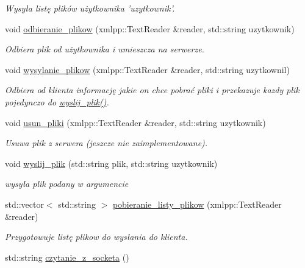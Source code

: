 \begin{CompactItemize}
\begin{CompactList}\small\item\em Wysyła listę plików użytkownika 'uzytkownik'. \item\end{CompactList}\item 
void \hyperlink{a00005_4e084ae10e8498b171c44a0138597d2e}{odbieranie\_\-plikow} (xmlpp::TextReader \&reader, std::string uzytkownik)
\begin{CompactList}\small\item\em Odbiera plik od użytkownika i umieszcza na serwerze. \item\end{CompactList}\item 
void \hyperlink{a00005_cc293df6220f5030fab5a7ee9cf8b1fa}{wysylanie\_\-plikow} (xmlpp::TextReader \&reader, std::string uzytkownil)
\begin{CompactList}\small\item\em Odbiera od klienta informację jakie on chce pobrać pliki i przekazuje kazdy plik pojedynczo do \hyperlink{a00005_771537f72f9e6a9cdb1d2961828eb66b}{wyslij\_\-plik()}. \item\end{CompactList}\item 
void \hyperlink{a00005_7ef79f818429f70b9cb35c0a33b59a10}{usun\_\-pliki} (xmlpp::TextReader \&reader, std::string uzytkownik)
\begin{CompactList}\small\item\em Usuwa plik z serwera (jeszcze nie zaimplementowane). \item\end{CompactList}\item 
void \hyperlink{a00005_771537f72f9e6a9cdb1d2961828eb66b}{wyslij\_\-plik} (std::string plik, std::string uzytkownik)
\begin{CompactList}\small\item\em wysyła plik podany w argumencie \item\end{CompactList}\item 
std::vector$<$ std::string $>$ \hyperlink{a00005_05500b74ebdcc1578ead4c31fca73a5b}{pobieranie\_\-listy\_\-plikow} (xmlpp::TextReader \&reader)
\begin{CompactList}\small\item\em Przygotowuje listę plikow do wysłania do klienta. \item\end{CompactList}\item 
std::string \hyperlink{a00005_272ecc740702b4f48efdb8469b414b24}{czytanie\_\-z\_\-socketa} ()
\end{CompactItemize}

